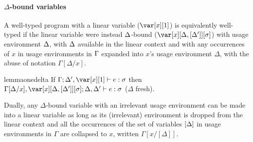 \documentclass[acmsmall,review,screen]{acmart}
\newcommand{\ROUNDTWO}[1]{{\color{red}#1}}
\begin{document}
\renewcommand{\DeltaLinearRelationLemma}{
\begin{restatable}[$\Delta$-bound to Linear]{lemma}{deltaone}\label{lem:deltaone}
If $\G,\x[\irr{\D}]; \irr{\D},\D' \vdash e : \s$ 
then $\G[x/\irr{\D}]; \D',\xl \vdash e :\s$.
\end{restatable}
}

\renewcommand{\LinearDeltaRelationLemma}{
  \begin{restatable}[Linear to $\Delta$-bound]{lemma}{onedelta}\label{lem:onedelta}
If $\G; \D',\xl \vdash e :\s$
then $\G[\D/x],\xD; \D,\D' \vdash e : \s$ ($\Delta$ fresh).
\end{restatable}
}

\renewcommand{\DeltaUnrestrictedRelationLemma}{
\begin{restatable}[Unrestricted and $\Delta$-bound]{lemma}{undelta}\label{lem:undelta}
$\G,\xo; \D \vdash e : \s$ iff $\G,\x[\ROUNDTWO{\emptyset}]; \D \vdash e : \s$
\end{restatable}
}

\paragraph{$\Delta$-bound variables} %
A well-typed program with a linear variable ($\xl$) is equivalently
well-typed if the linear variable were instead $\Delta$-bound ($\xD$) with
usage environment $\Delta$, with $\Delta$ available in the linear context and
\ROUNDTWO{with any occurrences of $x$ in usage environments in $\Gamma$
  expanded into $x$'s usage environment $\Delta$, with the abuse of notation $\Gamma[\Delta/x]$.}

\LinearDeltaRelationLemma


\noindent Dually, any $\Delta$-bound variable with an irrelevant usage
environment can be made into a linear variable as long as its
(irrelevant) environment is dropped from the linear context
\ROUNDTWO{and all the occurrences of the set of variables $[\Delta]$ in
  usage environments in $\Gamma$ are collapsed to $x$, written $\Gamma[x/[\Delta]]$}.
\end{document}
